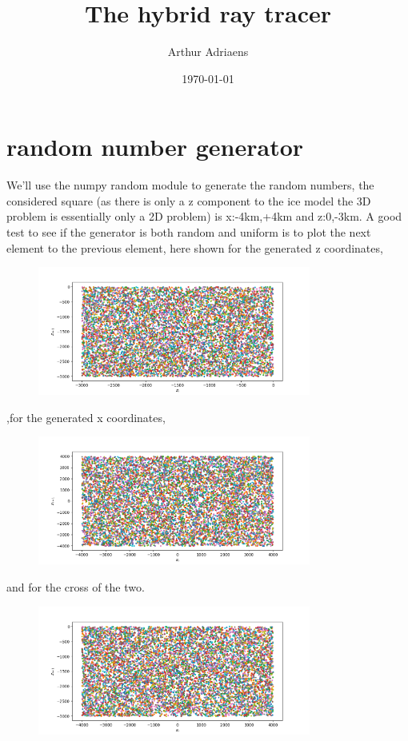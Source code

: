 \documentclass{article}
\title{The hybrid ray tracer}
\author{Arthur Adriaens}
\date{\today}
\begin{document}
	\maketitle
	\section{random number generator}
	We'll use the numpy random module to generate the random numbers, the considered square (as there is only a z component to the ice model the 3D problem is essentially only a 2D problem) is x:-4km,+4km and z:0,-3km. A good test to see if the generator is both random and uniform is to plot the next element to the previous element, here shown for the generated z coordinates,
\begin{figure}[ht]
	\centering
	\includegraphics[width=0.8\textwidth]{figures/randomnumberz.png}

\end{figure}
,for the generated x coordinates,
\begin{figure}[ht]
	\centering
	\includegraphics[width=0.8\textwidth]{figures/randomnumberx.png}
\end{figure}
and for the cross of the two.
\begin{figure}[ht]
	\centering
	\includegraphics[width=0.8\textwidth]{figures/randomnumbercross.png}
\end{figure}
\end{document}
